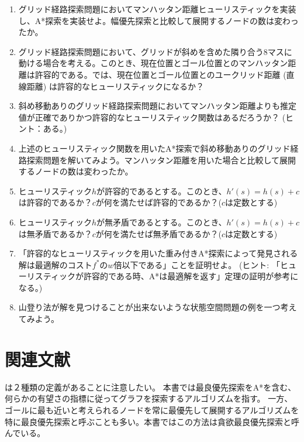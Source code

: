 \begin{enumerate}
  \item グリッド経路探索問題においてマンハッタン距離ヒューリスティックを実装し、A*探索を実装せよ。幅優先探索と比較して展開するノードの数は変わったか。

  \item グリッド経路探索問題において、グリッドが斜めを含めた隣り合う8マスに動ける場合を考える。このとき、現在位置とゴール位置とのマンハッタン距離は許容的である。では、現在位置とゴール位置とのユークリッド距離 (直線距離) は許容的なヒューリスティックになるか？
  
  \item 斜め移動ありのグリッド経路探索問題においてマンハッタン距離よりも推定値が正確でありかつ許容的なヒューリスティック関数はあるだろうか？
  (ヒント：ある。)
  
  \item 上述のヒューリスティック関数を用いたA*探索で斜め移動ありのグリッド経路探索問題を解いてみよう。マンハッタン距離を用いた場合と比較して展開するノードの数は変わったか。
  
  \item ヒューリスティック$h$が許容的であるとする。このとき、$h'(s) = h(s) + c$は許容的であるか？$c$が何を満たせば許容的であるか？($c$は定数とする)
  \item ヒューリスティック$h$が無矛盾であるとする。このとき、$h'(s) = h(s) + c$は無矛盾であるか？$c$が何を満たせば無矛盾であるか？($c$は定数とする)
  
  \item 「許容的なヒューリスティックを用いた重み付きA*探索によって発見される解は最適解のコスト$f^*$の$w$倍以下である」ことを証明せよ。
  (ヒント: 「ヒューリスティックが許容的である時、A*は最適解を返す」定理の証明が参考になる。)
  
  \item 山登り法が解を見つけることが出来ないような状態空間問題の例を一つ考えてみよう。
\end{enumerate}


\section{関連文献}

は２種類の定義があることに注意したい。
本書では最良優先探索をA*を含む、何らかの有望さの指標に従ってグラフを探索するアルゴリズムを指す。
一方、ゴールに最も近いと考えられるノードを常に最優先して展開するアルゴリズムを特に最良優先探索と呼ぶことも多い。本書ではこの方法は貪欲最良優先探索と呼んでいる。

